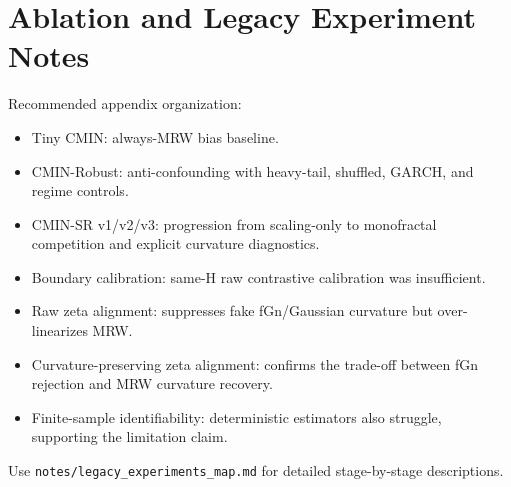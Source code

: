 \section{Ablation and Legacy Experiment Notes}

Recommended appendix organization:

\begin{itemize}
  \item Tiny CMIN: always-MRW bias baseline.
  \item CMIN-Robust: anti-confounding with heavy-tail, shuffled, GARCH, and regime controls.
  \item CMIN-SR v1/v2/v3: progression from scaling-only to monofractal competition and explicit curvature diagnostics.
  \item Boundary calibration: same-H raw contrastive calibration was insufficient.
  \item Raw zeta alignment: suppresses fake fGn/Gaussian curvature but over-linearizes MRW.
  \item Curvature-preserving zeta alignment: confirms the trade-off between fGn rejection and MRW curvature recovery.
  \item Finite-sample identifiability: deterministic estimators also struggle, supporting the limitation claim.
\end{itemize}

Use \texttt{notes/legacy\_experiments\_map.md} for detailed stage-by-stage descriptions.
